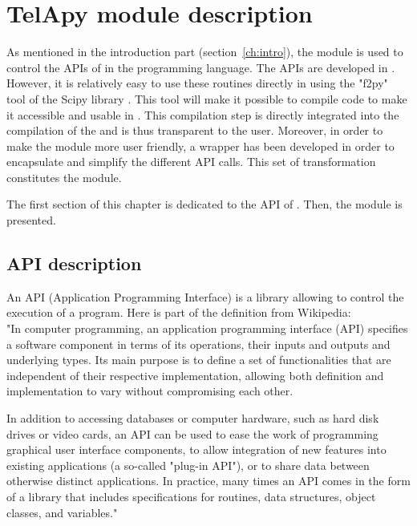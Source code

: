 \chapter{TelApy module description}\label{ch:TelApy_description}

As mentioned in the introduction part (section~\ref{ch:intro}), the \TelApy
module is used to control the APIs of \telemacsystem in the \python programming
language. The \telemacsystem APIs are developed in \fortran. However, it is
relatively easy to use these \fortran routines directly in \python using the
"f2py" tool of the \python Scipy library \cite{Peterson2009}. This tool will
make it possible to compile \fortran code to make it accessible and usable in
\python. This compilation step is directly integrated into the compilation of
the \telemacsystem and is thus transparent to the user. Moreover, in order to
make the \TelApy module more user friendly, a \python wrapper has been developed
in order to encapsulate and simplify the different API \python calls. This set
of transformation constitutes the \TelApy module.

The first section of this chapter is dedicated to the \fortran API of
\telemacsystem. Then, the \python \TelApy module is presented.

\section{\telemacsystem \fortran API description}
%
An API (Application Programming Interface) is a library allowing to control the
execution of a program. Here is part of the definition from Wikipedia:\\

"In computer programming, an application programming interface (API) specifies
a software component in terms of its operations, their inputs and outputs and
underlying types. Its main purpose is to define a set of functionalities that
are independent of their respective implementation, allowing both definition
and implementation to vary without compromising each other.

In addition to accessing databases or computer hardware, such as hard disk
drives or video cards, an API can be used to ease the work of programming
graphical user interface components, to allow integration of new features into
existing applications (a so-called "plug-in API"), or to share data between
otherwise distinct applications. In practice, many times an API comes in the
form of a library that includes specifications for routines, data structures,
object classes, and variables." \\

